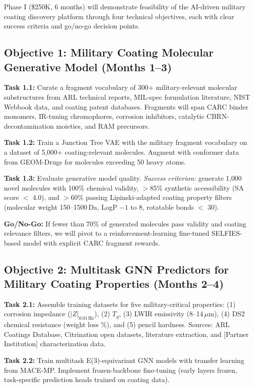 \documentclass[11pt,letterpaper]{article}
\begin{document}
Phase I (\$250K, 6 months) will demonstrate feasibility of the AI-driven military coating discovery platform through four technical objectives, each with clear success criteria and go/no-go decision points.

\subsection{Objective 1: Military Coating Molecular Generative Model (Months 1--3)}

\textbf{Task 1.1:} Curate a fragment vocabulary of 300+ military-relevant molecular substructures from ARL technical reports, MIL-spec formulation literature, NIST Webbook data, and coating patent databases. Fragments will span CARC binder monomers, IR-tuning chromophores, corrosion inhibitors, catalytic CBRN-decontamination moieties, and RAM precursors.

\textbf{Task 1.2:} Train a Junction Tree VAE with the military fragment vocabulary on a dataset of 5,000+ coating-relevant molecules. Augment with conformer data from GEOM-Drugs for molecules exceeding 50 heavy atoms.

\textbf{Task 1.3:} Evaluate generative model quality. \textit{Success criterion:} generate 1,000 novel molecules with 100\% chemical validity, $>$85\% synthetic accessibility (SA score $<$ 4.0), and $>$60\% passing Lipinski-adapted coating property filters (molecular weight 150--1500\,Da, LogP $-1$ to 8, rotatable bonds $<$ 30).

\textbf{Go/No-Go:} If fewer than 70\% of generated molecules pass validity and coating relevance filters, we will pivot to a reinforcement-learning fine-tuned SELFIES-based model with explicit CARC fragment rewards.

\subsection{Objective 2: Multitask GNN Predictors for Military Coating Properties (Months 2--4)}

\textbf{Task 2.1:} Assemble training datasets for five military-critical properties: (1) corrosion impedance ($|Z|_{0.01\,\mathrm{Hz}}$), (2) $T_g$, (3) LWIR emissivity (8--14\,$\mu$m), (4) DS2 chemical resistance (weight loss \%), and (5) pencil hardness. Sources: ARL Coatings Database, Citrination open datasets, literature extraction, and [Partner Institution] characterization data.

\textbf{Task 2.2:} Train multitask E(3)-equivariant GNN models with transfer learning from MACE-MP. Implement frozen-backbone fine-tuning (early layers frozen, task-specific prediction heads trained on coating data).
\end{document}
